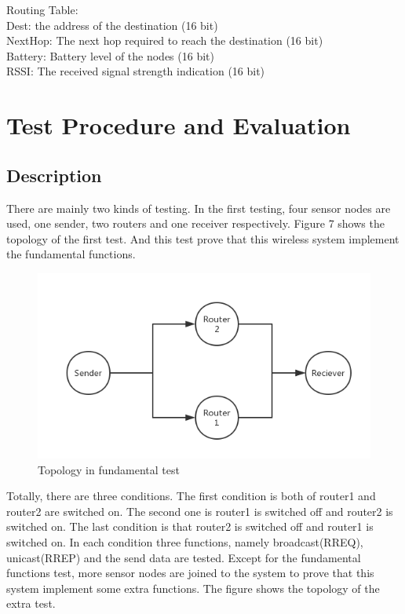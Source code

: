 \documentclass[a4paper]{article}
\begin{document}
Routing Table: \\
Dest: the address of the destination (16 bit) \\
NextHop: The next hop required to reach the destination (16 bit)  \\
Battery: Battery level of the nodes (16 bit) \\
RSSI: The received signal strength indication (16 bit) \\

\section{Test Procedure and Evaluation}

\subsection{Description}

There are mainly two kinds of testing. In the first testing, four sensor nodes are used, one sender, two routers and one receiver respectively. Figure 7 shows the topology of the first test. And this test prove that this wireless system implement the fundamental functions.

\begin{figure}[!htb]
   \centering
   \includegraphics[scale=0.5]{testtopology1}
	\begin{center}
	   \caption{Topology in fundamental test}
	\end{center}	   
    \label{fig:testtopology1}
\end{figure}

Totally, there are three conditions. The first condition is both of router1 and router2 are switched on. The second one is router1 is switched off and router2 is switched on. The last condition is that router2 is switched off and router1 is switched on. In each condition three functions, namely broadcast(RREQ), unicast(RREP) and the send data are tested. 
Except for the fundamental functions test, more sensor nodes are joined to the system to prove that this system implement some extra functions. The figure shows the topology of the extra test. 
\end{document}
